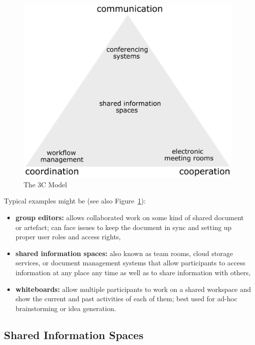 \begin{figure}[H]
 \centering
 \includegraphics[width=0.8\columnwidth]{images/3C-model.pdf}
 \caption[The 3C Model]{The 3C Model \citep{Koch2008}}
\label{fig:images_cscw_3C_model}
\end{figure}

Typical examples might be (see also Figure~\ref{fig:images_cscw_3C_model}):

\begin{itemize}
  \item \textbf{group editors:} allows collaborated work on some kind of shared document or artefact; can face issues to keep the document in sync and setting up proper user roles and access rights,
  \item \textbf{shared information spaces:} also known as team rooms, cloud storage services, or document management systems that allow participants to access information at any place any time as well as to share information with others,
  \item \textbf{whiteboards:} allow multiple participants to work on a shared workspace and show the current and past activities of each of them; best used for ad-hoc brainstorming or idea generation.
\end{itemize}


\subsection{Shared Information Spaces}
\label{sec:cscw_shared_spaces}


